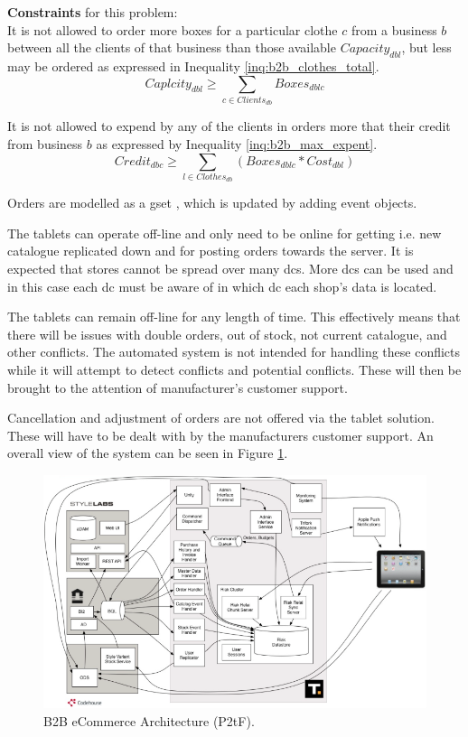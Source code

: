 {\bf Constraints} for this problem:\\
It is not allowed to order more boxes for a particular clothe $c$ from a business $b$ between all the clients of that business than those available $Capacity_{dbl}$, but less may be ordered as expressed in Inequality \ref{inq:b2b_clothes_total}.
\begin{equation} \label{inq:b2b_clothes_total}
	Caplcity_{dbl} \ge \sum_{c \in Clients_{db}} Boxes_{dblc}
\end{equation}

It is not allowed to expend by any of the clients in orders more that their credit from business $b$ as expressed by Inequality \ref{inq:b2b_max_expent}.
\begin{equation} \label{inq:b2b_max_expent}
	Credit_{dbc} \ge \sum_{l \in Clothes_{db}} (Boxes_{dblc} * Cost_{dbl})
\end{equation}

Orders are modelled as a \gls{gset} \cite{shapiro11comprehensive}, which is updated by adding event objects.

The tablets can operate off-line and only need to be online for getting i.e. new catalogue replicated down and for posting orders towards the server. It is expected that stores cannot be spread over many \glspl{dc}. More \glspl{dc} can be used and in this case each \gls{dc} must be aware of in which \gls{dc} each shop's data is located.

The tablets can remain off-line for any length of time. This effectively means that there will be issues with double orders, out of stock, not current catalogue, and other conflicts. The automated system is not intended for handling these conflicts while it will attempt to detect conflicts and potential conflicts. These will then be brought to the attention of manufacturer's customer support.

Cancellation and adjustment of orders are not offered via the tablet solution. These will have to be dealt with by the manufacturers customer support. An overall view of the system can be seen in Figure \ref{fig:b2b_architecture}.
\begin{figure}[ht!]
	\centering
	\includegraphics[width=1\textwidth]{figures/b2b.png}
	
	\caption{B2B eCommerce Architecture (P2tF).}
	\label{fig:b2b_architecture}
\end{figure}

